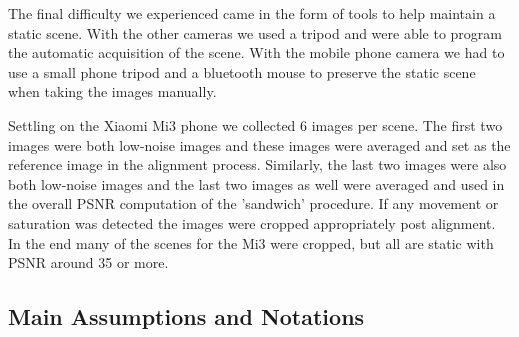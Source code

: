 \documentclass[review]{elsarticle}
\begin{document}
\begin{table*}[htb]
\vspace{-3mm}
\centering
\caption {Description of the dataset and size \label{tab:datastats}}
\vskip -1mm
\vspace{-4mm}
\end{table*}


The final difficulty we experienced came in the form of tools to help maintain a static scene. With the other cameras we used a tripod and were able to program the automatic acquisition of the scene. With the mobile phone camera we had to use a small phone tripod and a bluetooth mouse to preserve the static scene when taking the images manually.  

Settling on the Xiaomi Mi3 phone we collected 6 images per scene. The first two images were both low-noise images and these images were averaged and set as the reference image in the alignment process. Similarly, the last two images were also both low-noise images and the last two images as well were averaged and used in the overall PSNR computation of the 'sandwich' procedure. If any movement or saturation was detected the images were cropped appropriately post alignment. In the end many of the scenes for the Mi3 were cropped, but all are static with PSNR around 35 or more.


\subsection{Main Assumptions and Notations}\label{sec:assumptions}
\end{document}
